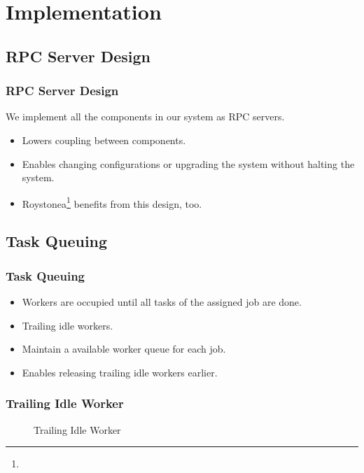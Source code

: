 \section{Implementation}
\subsection{RPC Server Design}
\begin{frame}
  \frametitle{RPC Server Design}
  We implement all the components in our system as RPC servers.
  \begin{itemize}
    \item Lowers coupling between components.
    \item Enables changing configurations or upgrading the system
      without halting the system.
    \item Roystonea\footnote[frame]{\tiny{}}
      benefits from this design, too.
  \end{itemize}
\end{frame}
\subsection{Task Queuing}
\begin{frame}
  \frametitle{Task Queuing}
  \begin{itemize}
    \item Workers are occupied until all tasks of the assigned job are
      done.
    \item Trailing idle workers.
    \item Maintain a available worker queue for each job.
    \item Enables releasing trailing idle workers earlier.
  \end{itemize}
\end{frame}

\begin{frame}
  \frametitle{Trailing Idle Worker}

  \begin{figure}[h]
    \centering
    \resizebox{\textheight}{!}{
      
    }
    \caption{Trailing Idle Worker}
  \end{figure}
\end{frame}

